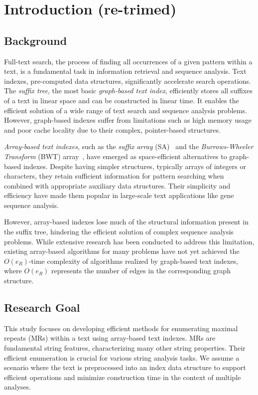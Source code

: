 \section{Introduction (re-trimed)}

\subsection{Background}
Full-text search, the process of finding all occurrences of a given pattern within a text, is a fundamental task in information retrieval and sequence analysis. Text indexes, pre-computed data structures, significantly accelerate search operations. The \textit{suffix tree}, the most basic \textit{graph-based text index}, efficiently stores all suffixes of a text in linear space and can be constructed in linear time. It enables the efficient solution of a wide range of text search and sequence analysis problems. However, graph-based indexes suffer from limitations such as high memory usage and poor cache locality due to their complex, pointer-based structures.

\textit{Array-based text indexes}, such as the \textit{suffix array} (SA)~\cite{manber:myers1993suffixarrays} and the \textit{Burrows-Wheeler Transform} (BWT) array~\cite{Ferragina05:FM}, have emerged as space-efficient alternatives to graph-based indexes. Despite having simpler structures, typically arrays of integers or characters, they retain sufficient information for pattern searching when combined with appropriate auxiliary data structures. Their simplicity and efficiency have made them popular in large-scale text applications like gene sequence analysis.

However, array-based indexes lose much of the structural information present in the suffix tree, hindering the efficient solution of complex sequence analysis problems. While extensive research has been conducted to address this limitation, existing array-based algorithms for many problems have not yet achieved the $O(e_R)$-time complexity of algorithms realized by graph-based text indexes, where $O(e_R)$ represents the number of edges in the corresponding graph structure.

\subsection{Research Goal}

This study focuses on developing efficient methods for enumerating maximal repeats (MRs) within a text using array-based text indexes. MRs are fundamental string features, characterizing many other string properties. Their efficient enumeration is crucial for various string analysis tasks. We assume a scenario where the text is preprocessed into an index data structure to support efficient operations and minimize construction time in the context of multiple analyses.

